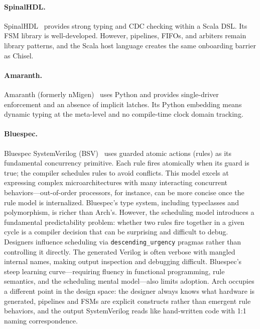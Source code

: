 \documentclass[11pt,twocolumn]{article}
\begin{document}
\paragraph{SpinalHDL.}
SpinalHDL~\cite{spinalhdl} provides strong typing and CDC checking within a Scala DSL. Its FSM library is well-developed. However, pipelines, FIFOs, and arbiters remain library patterns, and the Scala host language creates the same onboarding barrier as Chisel.

\paragraph{Amaranth.}
Amaranth (formerly nMigen)~\cite{amaranth} uses Python and provides single-driver enforcement and an absence of implicit latches. Its Python embedding means dynamic typing at the meta-level and no compile-time clock domain tracking.

\paragraph{Bluespec.}
Bluespec SystemVerilog (BSV)~\cite{bluespec} uses guarded atomic actions (rules) as its fundamental concurrency primitive. Each rule fires atomically when its guard is true; the compiler schedules rules to avoid conflicts. This model excels at expressing complex microarchitectures with many interacting concurrent behaviors---out-of-order processors, for instance, can be more concise once the rule model is internalized. Bluespec's type system, including typeclasses and polymorphism, is richer than Arch's.
However, the scheduling model introduces a fundamental predictability problem: whether two rules fire together in a given cycle is a compiler decision that can be surprising and difficult to debug. Designers influence scheduling via \texttt{descending\_urgency} pragmas rather than controlling it directly. The generated Verilog is often verbose with mangled internal names, making output inspection and debugging difficult. Bluespec's steep learning curve---requiring fluency in functional programming, rule semantics, and the scheduling mental model---also limits adoption. Arch occupies a different point in the design space: the designer always knows what hardware is generated, pipelines and FSMs are explicit constructs rather than emergent rule behaviors, and the output SystemVerilog reads like hand-written code with 1:1 naming correspondence.
\end{document}
